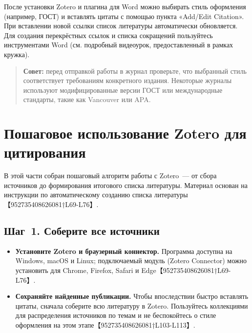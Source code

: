 \documentclass[
  russian,
  12pt,
  a4paper,
]{article}
\providecommand{\tightlist}{%
  \setlength{\itemsep}{0pt}\setlength{\parskip}{0pt}}
\begin{document}
После установки Zotero и плагина для Word можно выбирать стиль
оформления (например, ГОСТ) и вставлять цитаты с помощью пункта
«Add/Edit Citation». При вставлении новой ссылки список литературы
автоматически обновляется. Для создания перекрёстных ссылок и списка
сокращений пользуйтесь инструментами Word (см. подробный видеоурок,
предоставленный в рамках кружка).

\begin{quote}
\textbf{Совет:} перед отправкой работы в журнал проверьте, что выбранный
стиль соответствует требованиям конкретного издания. Некоторые журналы
используют модифицированные версии ГОСТ или международные стандарты,
такие как Vancouver или APA.
\end{quote}

\section{Пошаговое использование Zotero для
цитирования}\label{ux43fux43eux448ux430ux433ux43eux432ux43eux435-ux438ux441ux43fux43eux43bux44cux437ux43eux432ux430ux43dux438ux435-zotero-ux434ux43bux44f-ux446ux438ux442ux438ux440ux43eux432ux430ux43dux438ux44f}

В этой части собран пошаговый алгоритм работы с Zotero~--- от сбора
источников до формирования итогового списка литературы. Материал основан
на инструкции по автоматическому созданию списка литературы
【952735408626081†L69-L76】.

\subsection{Шаг~1. Соберите все
источники}\label{ux448ux430ux433-1.-ux441ux43eux431ux435ux440ux438ux442ux435-ux432ux441ux435-ux438ux441ux442ux43eux447ux43dux438ux43aux438}

\begin{itemize}
\tightlist
\item
  \textbf{Установите Zotero и браузерный коннектор.} Программа доступна
  на Windows, macOS и Linux; подключаемый модуль (Zotero Connector)
  можно установить для Chrome, Firefox, Safari и
  Edge【952735408626081†L69-L76】.
\item
  \textbf{Сохраняйте найденные публикации.} Чтобы впоследствии быстро
  вставлять цитаты, сначала соберите всю литературу в Zotero.
  Пользуйтесь коллекциями для распределения источников по темам и не
  беспокойтесь о стиле оформления на этом
  этапе【952735408626081†L103-L113】.
\end{itemize}
\end{document}
